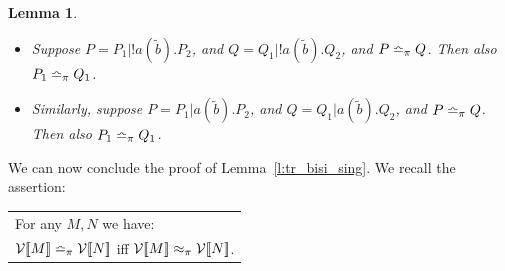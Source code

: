 \documentclass[11pt,a4paper]{amsart}
\theoremstyle{plain}
\theoremstyle{definition}
\theoremstyle{defC}
\theoremstyle{thmC}
\theoremstyle{plain}
\numberwithin{equation}{section}
\newcommand{\pairP}[1]{  #1 }      %
\def\inp#1#2{#1(#2)}
\newcommand{\rmm}[1]{{\tt{\lowercase{#1}}}}
\newcommand{\genTE}[1]{\mathrel{\bumpeq_{\rmm{\lowercase{#1}}}}}       %
\newcommand{\genwb}[1]{\mathrel{\approx_{\rmm{\lowercase{#1}}}}}       %
\newcommand{\wbPI}{\genwb{\pi}}       %
\newcommand{\TEPI}{\genTE{\pi}}       %
\newcommand{\til}[1]{\widetilde{#1}}
\newcommand{\tilb}{{\til b}}
\newcommand{\cbvSymb}{{\mathcal {V}}}
\newcommand{\encoEnvI}[1]{ \cbvSymb[\! [ #1 ] \! ]  } %
\theoremstyle{plain}
\newtheorem{lemma}[thm]{Lemma}
\theoremstyle{definition}
\begin{document}
\begin{lemma}
\label{l:par_tr}
$ $ 
\begin{itemize}
\item
Suppose $P = P_1 | ! \inp a {\tilb}.P_2$, 
and $Q = Q_1 | ! \inp a {\tilb}.Q_2$, 
and  $\pairP P \TEPI \pairP Q$.
Then also 
  $\pairP {P_1}  \TEPI \pairP {Q_1}$.


\item 
Similarly, suppose $P = P_1 |  \inp a {\tilb}.P_2$, 
and $Q = Q_1 |  \inp a {\tilb}.Q_2$, 
and  $\pairP {P} \TEPI \pairP {Q}$.
Then also 
  $\pairP {P_1}  \TEPI \pairP {Q_1}$.
\end{itemize}
 \end{lemma} 
\noindent
We can now conclude the proof of 
Lemma~\ref{l:tr_bisi_sing}.
We recall the assertion:
\begin{center}
\begin{tabular}{l}
For any $M,N$ we have:  \\
$
{\encoEnvI M} \TEPI {\encoEnvI N}
$ iff 
${\encoEnvI M} \wbPI {\encoEnvI N}$.
\end{tabular} 
\end{center} 
\end{document}
